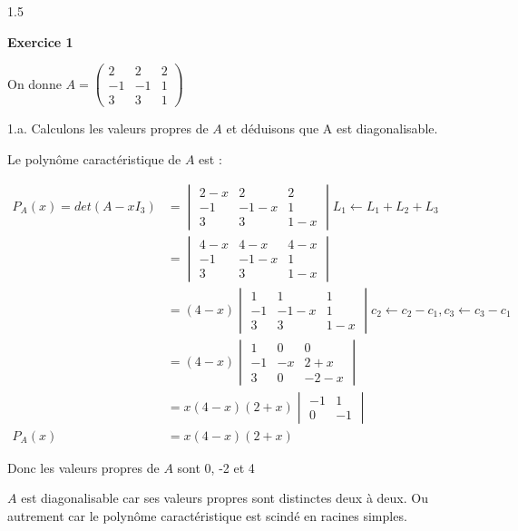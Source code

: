 \documentclass[12pt]{article}
\begin{document}
\begin{spacing}{1.5}

\medskip
\textbf{Exercice 1}

On donne $A=\begin{pmatrix}
2 & 2& 2 \\ 
-1 & -1 & 1 \\ 
3 & 3 & 1
\end{pmatrix} $

1.a. Calculons les valeurs propres de $A$ et déduisons que A est diagonalisable.

Le polynôme caractéristique de $A$ est :

\begin{align*}
P_A(x)=det(A-xI_3)&=\begin{vmatrix}
2-x & 2& 2 \\ 
-1 & -1-x & 1 \\ 
3 & 3 & 1-x
\end{vmatrix}L_1\leftarrow L_1+L_2+L_3\\
&=\begin{vmatrix}
4-x & 4-x & 4-x \\ 
-1 & -1-x & 1 \\ 
3 & 3 & 1-x
\end{vmatrix}\\
&=(4-x)\begin{vmatrix}
1 & 1 & 1 \\ 
-1 & -1-x & 1 \\ 
3 & 3 & 1-x
\end{vmatrix}c_2\leftarrow c_2-c_1, c_3\leftarrow c_3-c_1\\
&=(4-x)\begin{vmatrix}
1 & 0 & 0 \\ 
-1 & -x & 2+x \\ 
3 & 0 & -2-x
\end{vmatrix}\\
&=x(4-x)(2+x)\begin{vmatrix}
-1 & 1 \\ 
 0 & -1
\end{vmatrix}\\
P_A(x) &= x(4-x)(2+x)
\end{align*}

Donc les valeurs propres de $A$ sont 0, -2 et 4

$A$ est diagonalisable car ses valeurs propres sont distinctes deux à deux. Ou autrement car le polynôme caractéristique est scindé en racines simples.


\end{spacing}
\end{document}
